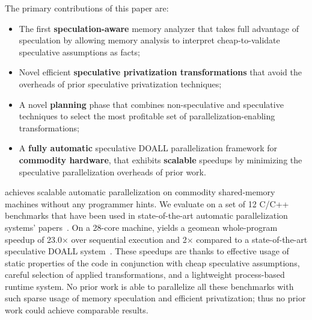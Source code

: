 The primary contributions of this paper are:
\begin{itemize}

\item The first \textbf{speculation-aware} memory analyzer that takes
full advantage of speculation by allowing memory analysis to interpret
cheap-to-validate speculative assumptions as facts;

\item Novel efficient \textbf{speculative privatization transformations}
that avoid the overheads of prior speculative privatization
techniques;

\item A novel \textbf{planning} phase that combines non-speculative
and speculative techniques to select the most profitable set of
parallelization-enabling transformations;

\item A \textbf{fully automatic} speculative DOALL parallelization
framework for \textbf{commodity hardware}, that exhibits
\textbf{scalable} speedups by minimizing the speculative
parallelization overheads of prior work.

\end{itemize}

\name achieves scalable automatic parallelization on commodity
shared-memory machines without any programmer hints.  We evaluate
\name on a set of 12 C/C++ benchmarks that have been used in
state-of-the-art automatic parallelization systems'
papers~\cite{johnson:12:pldi,kim:12:cgo,campanoni:12:cgo}. On a
28-core machine, \name yields a geomean whole-program speedup of
23.0$\times$ over sequential execution and 2$\times$ compared to a
state-of-the-art speculative DOALL system~\cite{johnson:12:pldi}.
These speedups are thanks to effective usage of static properties of
the code in conjunction with cheap speculative assumptions,
%
careful selection of applied transformations, and a lightweight
process-based runtime system.  No prior work is able to parallelize
all these benchmarks with such sparse usage of memory speculation and
efficient privatization; thus no prior work could achieve comparable results.
